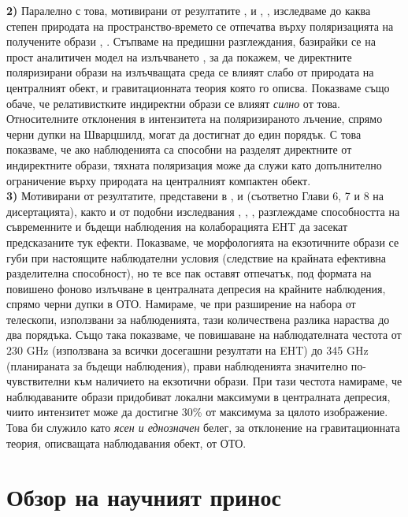\documentclass[12pt]{article}
\numberwithin{equation}{section}
\numberwithin{figure}{section}
\begin{document}
	\textbf{2)} Паралелно с това, мотивирани от резултатите \cite{EHT_M87_VII}, \cite{EHT_M87_VIII} и \cite{EHT_SGR_VII}, \cite{EHT_SGR_VIII}, изследваме до каква степен природата на пространство-времето се отпечатва върху поляризацията на получените образи \cite{Delijski2022}, \cite{Deliyski2023}. Стъпваме на предишни разглеждания, базирайки се на прост аналитичен модел на излъчването \cite{Narayan2021} \cite{Gelles2021}, за да покажем, че директните поляризирани образи на излъчващата среда се влияят слабо от природата на централният обект, и гравитационната теория която го описва. Показваме също обаче, че релативистките индиректни образи се влияят \emph{силно} от това. Относителните отклонения в интензитета на поляризираното лъчение, спрямо черни дупки на Шварцшилд, могат да достигнат до един порядък. С това показваме, че ако наблюденията са способни на разделят директните от индиректните образи, тяхната поляризация може да служи като допълнително ограничение върху природата на централният компактен обект.\\
	
	\textbf{3)} Мотивирани от резултатите, представени в \cite{Deliyski2022}, \cite{Delijski2022} и \cite{Deliyski2023} (съответно Глави 6, 7 и 8 на дисертацията), както и от подобни изследвания \cite{Eichhorn2022}, \cite{Qin2021}, \cite{Geometric_Modeling}, разглеждаме способността на съвременните и бъдещи наблюдения на колаборацията EHT да засекат предсказаните тук ефекти. Показваме, че морфологията на екзотичните образи се губи при настоящите наблюдателни условия (следствие на крайната ефективна разделителна способност), но те все пак оставят отпечатък, под формата на повишено фоново излъчване в централната депресия на крайните наблюдения, спрямо черни дупки в ОТО. Намираме, че при разширение на набора от телескопи, използвани за наблюденията, тази количествена разлика нараства до два порядъка. Също така показваме, че повишаване на наблюдателната честота от $230$ GHz (използвана за всички досегашни резултати на EHT) до 345 GHz (планираната за бъдещи наблюдения), прави наблюденията значително по-чувствителни към наличието на екзотични образи. При тази честота намираме, че наблюдаваните образи придобиват локални максимуми в централната депресия, чиито интензитет може да достигне 30\% от максимума за цялото изображение. Това би служило като \emph{ясен и еднозначен} белег, за отклонение на гравитационната теория, описващата наблюдавания обект, от ОТО.
	
	\newpage
	
	\section{Обзор на научният принос}
	
\end{document}

